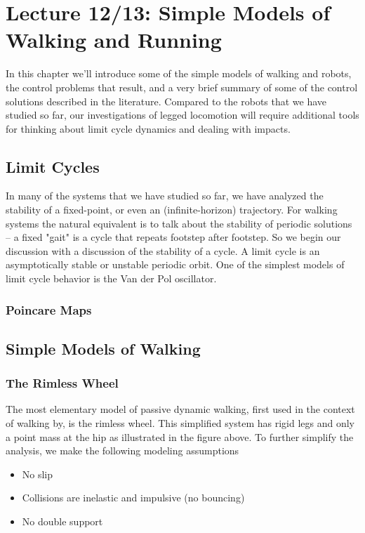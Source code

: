 \chapter{Lecture 12/13: Simple Models of Walking and Running}
In this chapter we'll introduce some of the simple models of walking and robots, the control problems that result, and a very brief summary of some of the control solutions described in the literature. Compared to the robots that we have studied so far, our investigations of legged locomotion will require additional tools for thinking about limit cycle dynamics and dealing with impacts.


\section{Limit Cycles}
In many of the systems that we have studied so far, we have analyzed the stability of a fixed-point, or even an (infinite-horizon) trajectory. For walking systems the natural equivalent is to talk about the stability of periodic solutions -- a fixed "gait" is a cycle that repeats footstep after footstep. So we begin our discussion with a discussion of the stability of a cycle.
A limit cycle is an asymptotically stable or unstable periodic orbit. One of the simplest models of limit cycle behavior is the Van der Pol oscillator.
\subsection{Poincare Maps}


\section{Simple Models of Walking}
\subsection{The Rimless Wheel}
The most elementary model of passive dynamic walking, first used in the context of walking by, is the rimless wheel. This simplified system has rigid legs and only a point mass at the hip as illustrated in the figure above. To further simplify the analysis, we make the following modeling assumptions
\begin{itemize}
\item No slip
\item Collisions are inelastic and impulsive (no bouncing)
\item No double support
\end{itemize}
